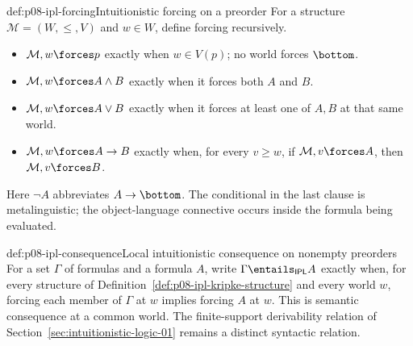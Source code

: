 \begin{hbdefinition}{def:p08-ipl-forcing}{Intuitionistic forcing on a preorder}
For a structure \(\mathcal M=(W,\leq,V)\) and \(w\in W\),
define forcing recursively.
\begin{itemize}
\item \(\mathcal M,w\forces p\) exactly when \(w\in V(p)\);
      no world forces \(\bottom\).
\item \(\mathcal M,w\forces A\land B\) exactly when it forces both
      \(A\) and \(B\).
\item \(\mathcal M,w\forces A\lor B\) exactly when it forces at least
      one of \(A,B\) at that same world.
\item \(\mathcal M,w\forces A\to B\) exactly when, for every
      \(v\geq w\), if \(\mathcal M,v\forces A\), then
      \(\mathcal M,v\forces B\).
\end{itemize}
Here \(\neg A\) abbreviates \(A\to\bottom\).
The conditional in the last clause is metalinguistic; the
object-language connective occurs inside the formula being evaluated.
\end{hbdefinition}

\begin{hbdefinition}{def:p08-ipl-consequence}{Local intuitionistic consequence on nonempty preorders}
For a set \(\Gamma\) of formulas and a formula \(A\), write
\(\Gamma\entails_{\mathsf{IPL}}A\) exactly when, for every
structure of Definition~\ref{def:p08-ipl-kripke-structure}
and every world \(w\), forcing each member of \(\Gamma\) at \(w\)
implies forcing \(A\) at \(w\).
This is semantic consequence at a common world.
The finite-support derivability relation of
Section~\ref{sec:intuitionistic-logic-01} remains a distinct
syntactic relation.
\end{hbdefinition}

